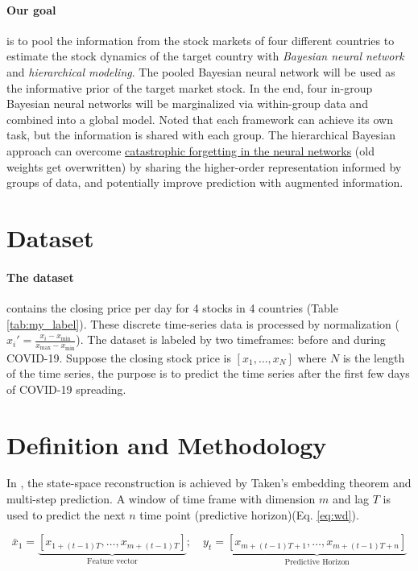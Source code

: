 \documentclass[a4paper]{article}
\begin{document}
\paragraph{Our goal} is to pool the information from the stock markets of four different countries to estimate the stock dynamics of the target country with \textit{Bayesian neural network} and \textit{hierarchical modeling}. The pooled Bayesian neural network will be used as the informative prior of the target market stock. In the end, four in-group Bayesian neural networks will be marginalized via within-group data and combined into a global model. Noted that each framework can achieve its own task, but the information is shared with each group. The hierarchical Bayesian approach can overcome \href{https://www.pnas.org/doi/10.1073/pnas.1611835114#sec-3}{catastrophic forgetting in the neural networks} (old weights get overwritten) by sharing the higher-order representation informed by groups of data, and potentially improve prediction with augmented information.


\section{Dataset}

\paragraph{The dataset} contains the closing price per day for 4 stocks in 4 countries (Table \ref{tab:my_label}). These discrete time-series data is processed by normalization ($x_{i}' = \frac{x_{i} - x_{\min}}{x_{\max} - x_{\min}}$). The dataset is labeled by two timeframes: before and during COVID-19. Suppose the closing stock price is $[x_1, \dots, x_N]$ where $N$ is the length of the time series, the purpose is to predict the time series after the first few days of COVID-19 spreading.


\section{Definition and Methodology}

In \cite{chandra2021bayesian}, the state-space reconstruction is achieved by Taken's embedding theorem and multi-step prediction. A window of time frame with dimension $m$ and lag $T$ is used to predict the next $n$ time point (predictive horizon)(Eq. \ref{eq:wd}).

\begin{equation}
\bar{x}_1 = \underbrace{[x_{1+(t-1)T}, \dots,x_{m+(t-1)T}]}_{\text{Feature vector}};\quad y_t = \underbrace{[x_{m+(t-1)T + 1}, \dots, x_{m+(t-1)T + n}]}_{\text{Predictive Horizon}}
\label{eq:wd}
\end{equation}
\end{document}
